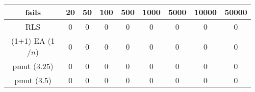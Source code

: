 \begin{tabular}[h]{ccccccccc}
fails&20&50&100&500&1000&5000&10000&50000\\\hline
RLS&0&0&0&0&0&0&0&0\\
(1+1) EA (1$/n$)&0&0&0&0&0&0&0&0\\
pmut (3.25)&0&0&0&0&0&0&0&0\\
pmut (3.5)&0&0&0&0&0&0&0&0\\
\end{tabular}
